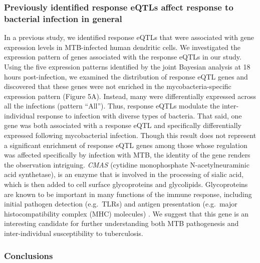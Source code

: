 \subsubsection{Previously identified response eQTLs affect response to
bacterial infection in
general}\label{previously-identified-response-eqtls-affect-response-to-bacterial-infection-in-general}

In a previous study, we identified response eQTLs that were associated
with gene expression levels in MTB-infected human dendritic cells. We
investigated the expression pattern of genes associated with the
response eQTLs in our study. Using the five expression patterns
identified by the joint Bayesian analysis at 18 hours post-infection, we
examined the distribution of response eQTL genes and discovered that
these genes were not enriched in the mycobacteria-specific expression
pattern (Figure 5A). Instead, many were differentially expressed across
all the infections (pattern ``All''). Thus, response eQTLs modulate the
inter-individual response to infection with diverse types of bacteria.
That said, one gene was both associated with a response eQTL and
specifically differentially expressed following mycobacterial infection.
Though this result does not represent a significant enrichment of
response eQTL genes among those whose regulation was affected
specifically by infection with MTB, the identity of the gene renders the
observation intriguing. \emph{CMAS} (cytidine monophosphate
N-acetylneuraminic acid synthetase), is an enzyme that is involved in
the processing of sialic acid, which is then added to cell surface
glycoproteins and glycolipids. Glycoproteins are known to be important
in many functions of the immune response, including initial pathogen
detection (e.g.~TLRs) and antigen presentation (e.g.~major
histocompatibility complex (MHC) molecules) \citep{Wolfert2013;
@Johnson2013, Crespo2013}. We suggest that this gene is an
interesting candidate for further understanding both MTB pathogenesis
and inter-individual susceptibility to tuberculosis.

\subsubsection{Conclusions}\label{conclusions}

